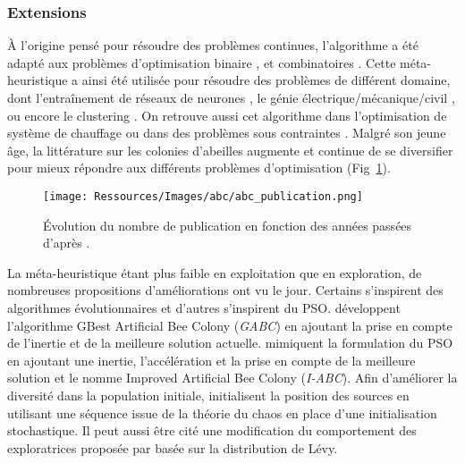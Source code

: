 \subsubsection{Extensions} %
\label{ssub:extensions}
À l’origine pensé pour résoudre des problèmes continues, l’algorithme a été adapté aux problèmes
d’optimisation binaire \parencite{Kashan2012342}, et combinatoires \parencite{Karaboga20113021}.
Cette méta-heuristique a ainsi été utilisée pour résoudre des problèmes de différent
domaine, dont l’entraînement de réseaux de neurones \parencite{Karaboga2007},
le génie électrique/mécanique/civil \parencite{Rao2009887}, ou encore le
clustering \parencite{Zhang20104761}. On retrouve aussi cet algorithme dans l’optimisation
de système de chauffage \parencite{Atashkari2011} ou dans des problèmes sous
contraintes \parencite{Tsai201480,Karaboga20113021}. Malgré son jeune âge, la littérature
sur les colonies d’abeilles augmente et continue de se diversifier pour mieux répondre
aux différents problèmes d’optimisation (Fig~\ref{fig:abc_publication}).

\begin{figure}
    \begin{center}
        \texttt{[image: Ressources/Images/abc/abc\_publication.png]}
    \end{center}
    \caption{Évolution du nombre de publication en fonction des années passées d’après
             \cite{Karaboga201221}.
             \label{fig:abc_publication}}
\end{figure}

La méta-heuristique étant plus faible en exploitation que en exploration, de nombreuses
propositions d’améliorations ont vu le jour. Certains s’inspirent des algorithmes
évolutionnaires \parencite{Bi2011174,Zhao2010558} et d’autres s’inspirent du PSO.
\cite{Zhu20103166} développent l’algorithme GBest Artificial Bee Colony (\textit{GABC}) en
ajoutant la prise en compte de l’inertie et de la meilleure solution actuelle.
\cite{Li2012320} mimiquent la formulation du PSO en ajoutant une inertie, l’accélération et la prise
en compte de la meilleure solution et le nomme Improved Artificial Bee Colony (\textit{I-ABC}).
Afin d’améliorer la diversité dans la population initiale, \cite{Xiang20131256}
initialisent la position des sources en utilisant une séquence issue de la théorie
du chaos en place d’une initialisation stochastique. Il peut aussi être cité
une modification du comportement des exploratrices proposée par \cite{Sharma2012213}
basée sur la distribution de Lévy.

